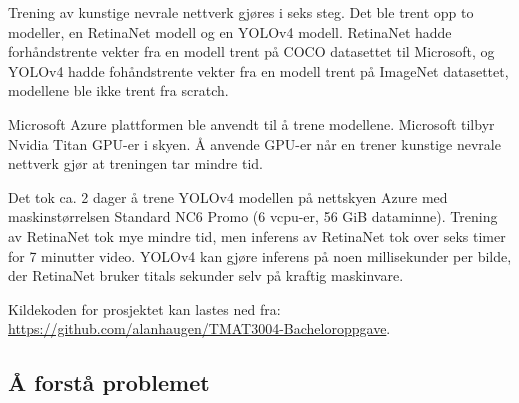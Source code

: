


Trening av kunstige nevrale nettverk gjøres i seks steg. Det ble trent opp to modeller, en RetinaNet modell og en YOLOv4 modell. RetinaNet hadde forhåndstrente vekter fra en modell trent på COCO datasettet til Microsoft, og YOLOv4 hadde fohåndstrente vekter fra en modell trent på ImageNet datasettet, modellene ble ikke trent fra scratch. %

Microsoft Azure plattformen ble anvendt til å trene modellene. Microsoft tilbyr Nvidia Titan GPU-er i skyen. Å anvende GPU-er når en trener kunstige nevrale nettverk gjør at treningen tar mindre tid.

Det tok ca. 2 dager å trene YOLOv4 modellen på nettskyen Azure med maskinstørrelsen Standard NC6 Promo (6 vcpu-er, 56 GiB dataminne). Trening av RetinaNet tok mye mindre tid, men inferens av RetinaNet tok over seks timer for 7 minutter video. YOLOv4 kan gjøre inferens på noen millisekunder per bilde, der RetinaNet bruker titals sekunder selv på kraftig maskinvare.%

Kildekoden for prosjektet kan lastes ned fra: \\ \url{https://github.com/alanhaugen/TMAT3004-Bacheloroppgave}.

\subsection{Å forstå problemet}

